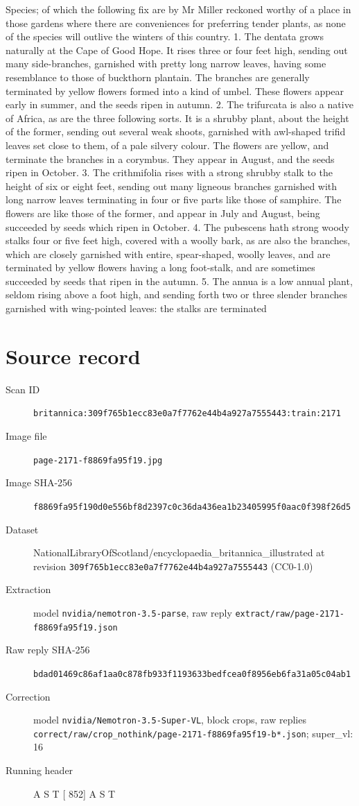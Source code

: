 \documentclass{article}
\begin{document}
Species; of which the following fix are by Mr Miller reckoned worthy of a place in those gardens where there are conveniences for preferring tender plants, as none of the species will outlive the winters of this country. 1. The dentata grows naturally at the Cape of Good Hope. It rises three or four feet high, sending out many side-branches, garnished with pretty long narrow leaves, having some resemblance to those of buckthorn plantain. The branches are generally terminated by yellow flowers formed into a kind of umbel. These flowers appear early in summer, and the seeds ripen in autumn. 2. The trifurcata is also a native of Africa, as are the three following sorts. It is a shrubby plant, about the height of the former, sending out several weak shoots, garnished with awl-shaped trifid leaves set close to them, of a pale silvery colour. The flowers are yellow, and terminate the branches in a corymbus. They appear in August, and the seeds ripen in October. 3. The crithmifolia rises with a strong shrubby stalk to the height of six or eight feet, sending out many ligneous branches garnished with long narrow leaves terminating in four or five parts like those of samphire. The flowers are like those of the former, and appear in July and August, being succeeded by seeds which ripen in October. 4. The pubescens hath strong woody stalks four or five feet high, covered with a woolly bark, as are also the branches, which are closely garnished with entire, spear-shaped, woolly leaves, and are terminated by yellow flowers having a long foot-stalk, and are sometimes succeeded by seeds that ripen in the autumn. 5. The annua is a low annual plant, seldom rising above a foot high, and sending forth two or three slender branches garnished with wing-pointed leaves: the stalks are terminated


\section*{Source record}
\begin{description}
\item[Scan ID] \texttt{britannica:309f765b1ecc83e0a7f7762e44b4a927a7555443:train:2171}
\item[Image file] \texttt{page-2171-f8869fa95f19.jpg}
\item[Image SHA-256] \texttt{f8869fa95f190d0e556bf8d2397c0c36da436ea1b23405995f0aac0f398f26d5}
\item[Dataset] NationalLibraryOfScotland/encyclopaedia\_britannica\_illustrated at revision \texttt{309f765b1ecc83e0a7f7762e44b4a927a7555443} (CC0-1.0)
\item[Extraction] model \texttt{nvidia/nemotron-3.5-parse}, raw reply \texttt{extract/raw/page-2171-f8869fa95f19.json}
\item[Raw reply SHA-256] \texttt{bdad01469c86af1aa0c878fb933f1193633bedfcea0f8956eb6fa31a05c04ab1}
\item[Correction] model \texttt{nvidia/Nemotron-3.5-Super-VL}, block crops, raw replies \texttt{correct/raw/crop\_nothink/page-2171-f8869fa95f19-b*.json}; super\_vl: 16
\item[Running header] A S T [ 852] A S T
\end{description}
\end{document}
